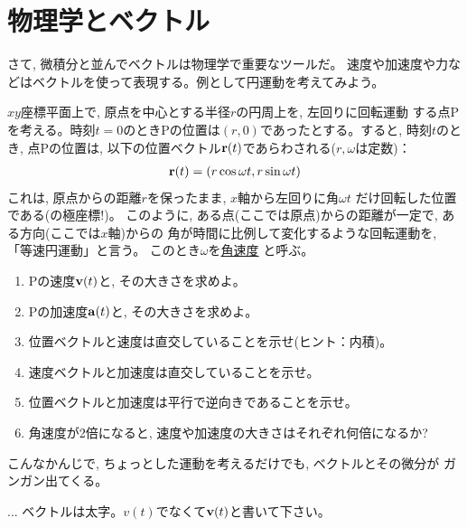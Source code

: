 \section{物理学とベクトル}

さて, 微積分と並んでベクトルは物理学で重要なツールだ。
速度や加速度や力などはベクトルを使って表現する。例として円運動を考えてみよう。

\begin{q}\label{q:vect_velocac2D1} $xy$座標平面上で, 原点を中心とする半径$r$の円周上を, 左回りに回転運動
する点Pを考える。時刻$t=0$のときPの位置は$(r,0)$であったとする。すると, 
時刻$t$のとき, 点Pの位置は, 以下の位置ベクトル${\bf r}(t)$であらわされる($r, \omega$は定数)：
\begin{eqnarray}
{\bf r}(t)=(r\cos\omega t, r\sin\omega t)
\end{eqnarray}
これは, 原点からの距離$r$を保ったまま, $x$軸から左回りに角$\omega t$
だけ回転した位置である(の極座標!)。
このように, ある点(ここでは原点)からの距離が一定で, ある方向(ここでは$x$軸)からの
角が時間に比例して変化するような回転運動を, 「等速円運動」と言う。
このとき$\omega$を\underline{角速度} と呼ぶ。
\begin{enumerate}
\item Pの速度${\bf v}(t)$と, その大きさを求めよ。
\item Pの加速度${\bf a}(t)$と, その大きさを求めよ。
\item 位置ベクトルと速度は直交していることを示せ(ヒント：内積)。
\item 速度ベクトルと加速度は直交していることを示せ。
\item 位置ベクトルと加速度は平行で逆向きであることを示せ。
\item 角速度が2倍になると, 速度や加速度の大きさはそれぞれ何倍になるか? 
\end{enumerate}\end{q}
\hv

こんなかんじで, ちょっとした運動を考えるだけでも, ベクトルとその微分が
ガンガン出てくる。\hv

\begin{faq}{\small{}
... ベクトルは太字。$v(t)$でなくて${\bf v}(t)$と書いて下さい。}\end{faq}
\hv

